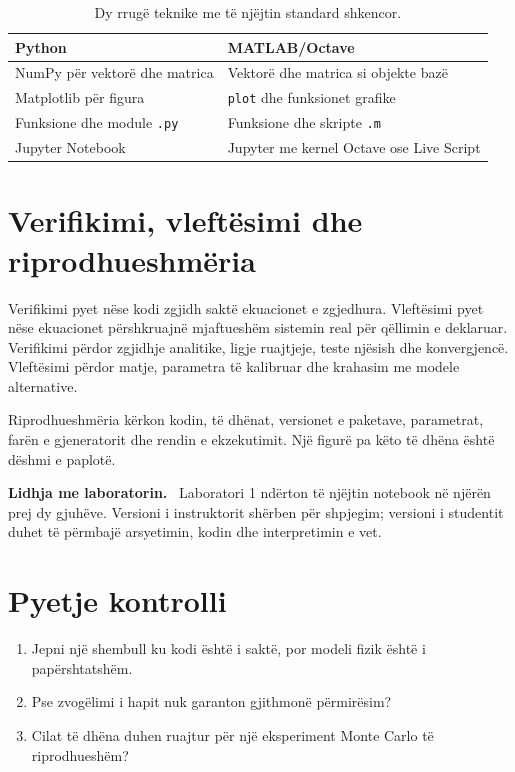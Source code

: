 \documentclass[11pt,oneside,openany]{book}
\newenvironment{lidhje}{\par\medskip\noindent\textbf{Lidhja me laboratorin.}\ }{\par\medskip}
\begin{document}
\begin{table}[ht]
\centering
\caption{Dy rrugë teknike me të njëjtin standard shkencor.}
\begin{tabularx}{\textwidth}{YY}
\toprule Python & MATLAB/Octave\\ \midrule
NumPy për vektorë dhe matrica & Vektorë dhe matrica si objekte bazë\\
Matplotlib për figura & \texttt{plot} dhe funksionet grafike\\
Funksione dhe module \texttt{.py} & Funksione dhe skripte \texttt{.m}\\
Jupyter Notebook & Jupyter me kernel Octave ose Live Script\\
\bottomrule
\end{tabularx}
\end{table}

\section{Verifikimi, vleftësimi dhe riprodhueshmëria}
Verifikimi pyet nëse kodi zgjidh saktë ekuacionet e zgjedhura. Vleftësimi pyet nëse ekuacionet përshkruajnë mjaftueshëm sistemin real për qëllimin e deklaruar. Verifikimi përdor zgjidhje analitike, ligje ruajtjeje, teste njësish dhe konvergjencë. Vleftësimi përdor matje, parametra të kalibruar dhe krahasim me modele alternative.

Riprodhueshmëria kërkon kodin, të dhënat, versionet e paketave, parametrat, farën e gjeneratorit dhe rendin e ekzekutimit. Një figurë pa këto të dhëna është dëshmi e paplotë.

\begin{lidhje}
Laboratori 1 ndërton të njëjtin notebook në njërën prej dy gjuhëve. Versioni i instruktorit shërben për shpjegim; versioni i studentit duhet të përmbajë arsyetimin, kodin dhe interpretimin e vet.
\end{lidhje}

\section*{Pyetje kontrolli}
\begin{enumerate}
\item Jepni një shembull ku kodi është i saktë, por modeli fizik është i papërshtatshëm.
\item Pse zvogëlimi i hapit nuk garanton gjithmonë përmirësim?
\item Cilat të dhëna duhen ruajtur për një eksperiment Monte Carlo të riprodhueshëm?
\end{enumerate}
\end{document}
